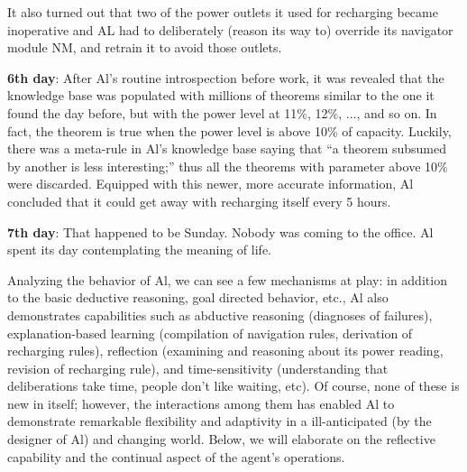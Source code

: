 \documentclass{llncs}
\begin{document}
It also turned out that two of the power outlets it used for recharging
became inoperative and AL had to deliberately (reason its way to) override
its navigator module NM, and retrain it to avoid those outlets.

\noindent \textbf{6th day}: After Al's routine introspection before
work, it was revealed that the knowledge base was populated with millions
of theorems similar to the one it found the day before, but with the power
level at 11\%, 12\%, ..., and so on.  In fact, the theorem is true when the
power level is above 10\% of capacity.  Luckily, there was a meta-rule in
Al's knowledge base saying that {}``a theorem subsumed by another is less
interesting;'' thus all the theorems with parameter above 10\% were
discarded.  Equipped with this newer, more accurate information, Al
concluded that it could get away with recharging itself every 5 hours.

\noindent \textbf{7th day}: That happened to be Sunday.  Nobody was
coming to the office.  Al spent its day contemplating the meaning of life.


Analyzing the behavior of Al, we can see a few mechanisms at play: in
addition to the basic deductive reasoning, goal directed behavior, etc., Al
also demonstrates capabilities such as abductive reasoning (diagnoses of
failures), explanation-based learning (compilation of navigation rules,
derivation of recharging rules), reflection (examining and reasoning about
its power reading, revision of recharging rule), and time-sensitivity
(understanding that deliberations take time, people don't like waiting,
etc).  Of course, none of these is new in itself; however, the interactions
among them has enabled Al to demonstrate remarkable flexibility and
adaptivity in a ill-anticipated (by the designer of Al) and changing world.
Below, we will elaborate on the reflective capability and the continual
aspect of the agent's operations.
\end{document}
